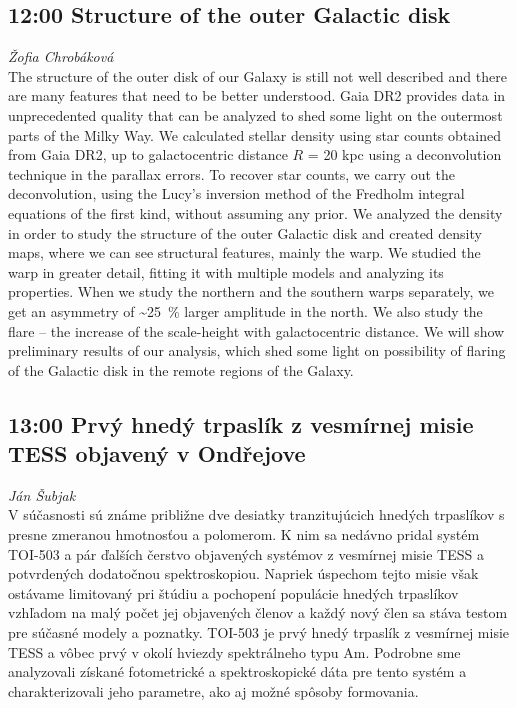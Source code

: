 \documentclass[a4paper]{report}
\begin{document}
                                                \begin{tcolorbox}
                            \subsection{12:00 \hfill Structure of the outer Galactic disk}
                                    \hfill \textit{Žofia Chrobáková} \\
                                                    The structure of the outer disk of our Galaxy is still not well described and there are many features that need to be better understood. Gaia DR2 provides data in unprecedented quality that can be analyzed to shed some light on the outermost parts of the Milky Way. We calculated stellar density using star counts obtained from Gaia DR2, up to galactocentric distance $R$ = 20 kpc using a deconvolution technique in the parallax errors. To recover star counts, we carry out the deconvolution, using the Lucy's inversion method of the Fredholm integral equations of the first kind, without assuming any prior. We analyzed the density in order to study the structure of the outer Galactic disk and created density maps, where we can see structural features, mainly the warp. We studied the warp in greater detail, fitting it with multiple models and analyzing its properties. When we study the northern and the southern warps separately, we get an asymmetry of \textasciitilde\SI{25}{\percent} larger amplitude in the north. We also study the flare -- the increase of the scale-height with galactocentric distance. We will show preliminary results of our analysis, which shed some light on possibility of flaring of the Galactic disk in the remote regions of the Galaxy.

                                            \end{tcolorbox}
                                                \begin{tcolorbox}
                            \subsection{13:00 \hfill Prvý hnedý trpaslík z vesmírnej misie TESS objavený v Ondřejove}
                                    \hfill \textit{Ján Šubjak} \\
                                                    V súčasnosti sú známe približne dve desiatky tranzitujúcich hnedých trpaslíkov s presne zmeranou hmotnosťou a polomerom. K nim sa nedávno pridal systém TOI-503 a pár ďalších čerstvo objavených systémov z vesmírnej misie TESS a potvrdených dodatočnou spektroskopiou. Napriek úspechom tejto misie však ostávame limitovaný pri štúdiu a pochopení populácie hnedých trpaslíkov vzhľadom na malý počet jej objavených členov a každý nový člen sa stáva testom pre súčasné modely a poznatky. TOI-503 je prvý hnedý trpaslík z vesmírnej misie TESS a vôbec prvý v okolí hviezdy spektrálneho typu Am. Podrobne sme analyzovali získané fotometrické a spektroskopické dáta pre tento systém a charakterizovali jeho parametre, ako aj možné spôsoby formovania.

                                            \end{tcolorbox}
\end{document}
